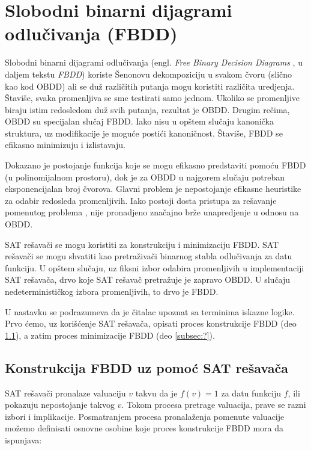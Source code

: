 \section{Slobodni binarni dijagrami odlu\v{c}ivanja (FBDD)}
\label{sec:FBDD}

Slobodni binarni dijagrami odlu\v{c}ivanja (engl. \emph{Free Binary Decision Diagrams} \cite{FBDD}, u daljem tekstu \emph{FBDD}) koriste \v{S}enonovu dekompoziciju u svakom \v{c}voru (sli\v{c}no kao kod OBDD) ali se du\v{z} razli\v{c}itih putanja mogu koristiti razli\v{c}ita uredjenja. \v{S}tavi\v{s}e, svaka promenljiva se sme testirati samo jednom. Ukoliko se promenljive biraju istim redosledom du\v{z} svih putanja, rezultat je OBDD. Drugim re\v{c}ima, OBDD su specijalan slu\v{c}aj FBDD. Iako nisu u op\v{s}tem slu\v{c}aju kanoni\v{c}ka struktura, uz modifikacije je mogu\'c{}e posti\'c{}i kanoni\v{c}nost. \v{S}tavi\v{s}e, FBDD se efikasno minimizuju i izlistavaju.

Dokazano je  postojanje funkcija koje se mogu efikasno predstaviti pomo\'c{}u FBDD (u polinomijalnom prostoru), dok je za OBDD u najgorem slu\v{c}aju potreban eksponencijalan broj \v{c}vorova. Glavni problem je nepostojanje efikasne heuristike za odabir redosleda promenljivih. Iako postoji dosta pristupa za re\v{s}avanje pomenutog problema \cite{FBDD}, nije pronadjeno zna\v{c}ajno br\v{z}e unapredjenje u odnosu na OBDD.

SAT re\v{s}ava\v{c}i se mogu koristiti za konstrukciju i minimizaciju FBDD. SAT re\v{s}ava\v{c}i se mogu shvatiti kao pretra\v{z}iva\v{c}i binarnog stabla odlu\v{c}ivanja za datu funkciju. U op\v{s}tem slu\v{c}aju, uz fiksni izbor odabira promenljivih u implementaciji SAT re\v{s}ava\v{c}a, drvo koje SAT re\v{s}ava\v{c} pretra\v{z}uje je zapravo OBDD. U slu\v{c}aju nedeterministi\v{c}kog izbora promenljivih, to drvo je FBDD.

U nastavku se podrazumeva da je \v{c}italac upoznat sa terminima iskazne logike. Prvo \'c{}emo, uz kori\v{s}\'c{}enje SAT re\v{s}ava\v{c}a, opisati proces konstrukcije FBDD (deo \ref{subsec:FBDDConstructionViaSAT}), a zatim proces minimizacije FBDD (deo \ref{subsec:?}).


\subsection{Konstrukcija FBDD uz pomo\'c{} SAT re\v{s}ava\v{c}a}
\label{subsec:FBDDConstructionViaSAT}

SAT re\v{s}ava\v{c}i pronalaze valuaciju $v$ takvu da je $f(v) = 1$ za datu funkciju $f$, ili pokazuju nepostojanje takvog $v$. Tokom procesa pretrage valuacija, prave se razni izbori i implikacije. Posmatranjem procesa pronala\v{z}enja pomenute valuacije mo\v{z}emo definisati osnovne osobine koje proces konstrukcije FBDD mora da ispunjava:

